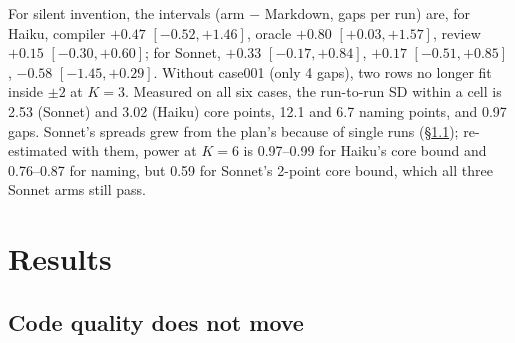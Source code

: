 \documentclass{article}
\begin{document}
For silent invention, the intervals (arm $-$ Markdown, gaps per run) are, for Haiku, compiler $+0.47$
$[-0.52, +1.46]$, oracle $+0.80$ $[+0.03, +1.57]$, review $+0.15$ $[-0.30, +0.60]$; for Sonnet, $+0.33$
$[-0.17, +0.84]$, $+0.17$ $[-0.51, +0.85]$, $-0.58$ $[-1.45, +0.29]$. Without case001 (only 4 gaps), two rows no
longer fit inside $\pm 2$ at $K = 3$. Measured on all six cases, the run-to-run SD within a cell is 2.53
(Sonnet) and 3.02 (Haiku) core points, 12.1 and 6.7 naming points, and 0.97 gaps. Sonnet's spreads grew from
the plan's because of single runs (\S\ref{sec:core}); re-estimated with them, power at $K = 6$ is 0.97--0.99
for Haiku's core bound and 0.76--0.87 for naming, but 0.59 for Sonnet's 2-point core bound, which all three
Sonnet arms still pass.

\section{Results}

\subsection{Code quality does not move}\label{sec:core}
\end{document}
